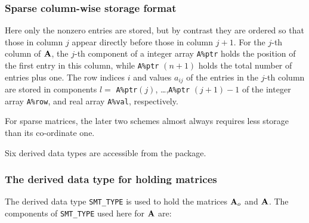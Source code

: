 \documentclass{galahad}
\begin{document}
\subsubsection{Sparse column-wise storage format}\label{colwise}
Here only the nonzero entries are stored, but by contrast
they are ordered so that those in column $j$ appear directly before those
in column $j+1$. For the $j$-th column of ${\mathbf{A}}$, the $j$-th component of a
integer array {\tt A\%ptr} holds the position of the first entry in this column,
while {\tt A\%ptr} $(n+1)$ holds the total number of entries plus one.
The row indices $i$ and values $a_{ij}$ of the entries in the $j$-th column
are stored in components
$l =$ {\tt A\%ptr}$(j)$, \ldots ,{\tt A\%ptr} $(j+1)-1$ of the
integer array {\tt A\%row}, and real array {\tt A\%val}, respectively.

For sparse matrices, the later two schemes almost always requires less storage
than its co-ordinate one.



\galtypes
Six derived data types are accessible from the package.


\subsubsection{The derived data type for holding matrices}\label{typesmt}
The derived data type {\tt SMT\_TYPE} is used to hold the matrices ${\mathbf{A}}_o$
and ${\mathbf{A}}$. The components of {\tt SMT\_TYPE} used here for ${\mathbf{A}}$
are:
\end{document}
